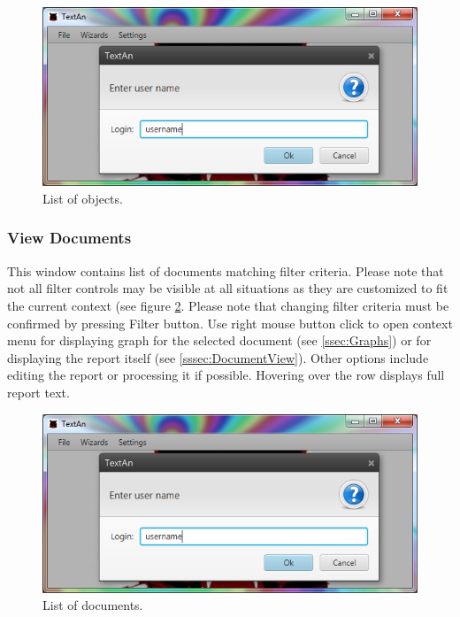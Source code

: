 \documentclass[12pt,a4paper]{report}
\begin{document}
\begin{figure}[!htb]
        \centering
        \includegraphics[width=\textwidth]{Images/objectlist}
        \caption{List of objects.}
        \label{fig:ObjectList}
\end{figure}

\subsubsection{View Documents}
\label{sssec:DocumentList}

This window contains list of documents matching filter criteria. Please note
that not all filter controls may be visible at all situations as they are
customized to fit the current context (see figure \ref{fig:DocumentList}.
Please note that changing filter criteria must be confirmed by pressing Filter
button. Use right mouse button click to open context menu for displaying graph
for the selected document (see \ref{ssec:Graphs}) or for displaying the report
itself (see \ref{sssec:DocumentView}). Other options include editing the report
or processing it if possible. Hovering over the row displays full report text.

\begin{figure}[!htb]
        \centering
        \includegraphics[width=\textwidth]{Images/documentlist}
        \caption{List of documents.}
        \label{fig:DocumentList}
\end{figure}
\end{document}
